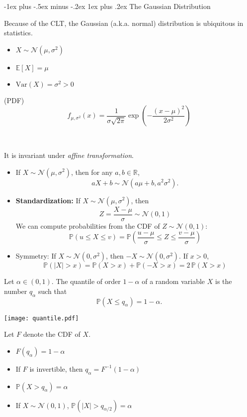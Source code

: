 \documentclass[a4paper, 10pt,landscape]{article}
\makeatletter
\newcommand{\var}{\textrm{Var}}
\renewcommand{\subsubsection}{\@startsection{subsubsection}{3}{0mm}%
                                {-1ex plus -.5ex minus -.2ex}%
                                {1ex plus .2ex}%
                                {\normalfont\small\bfseries}}
\makeatother
\begin{document}
\begin{multicols*}{3}
\subsubsection{The Gaussian Distribution}
\begin{description}
	\item Because of the CLT, the Gaussian (a.k.a. normal) distribution is ubiquitous in statistics.
	\begin{itemize}
		\item $X\sim\mathcal{N}\left(\mu,\sigma^2\right)$
		\item $\mathbb{E}\left[X\right]=\mu$
		\item $\var(X)=\sigma^2>0$
	\end{itemize}
	\item[Gaussian density] (PDF)
	$$f_{\mu,\sigma^2}(x)=\frac{1}{\sigma\sqrt{2\pi}}\exp\left(-\frac{(x-\mu)^2}{2\sigma^2}\right)$$
	\item[Useful Properties of Gaussian] ~

	It is invariant under {\it affine transformation}.
	\begin{itemize}
	\item  If $X\sim\mathcal{N}\left(\mu,\sigma^2\right)$, then for any $a,b\in\mathbb{R}$,
	$$aX+b\sim\mathcal{N}\left(a\mu+b,a^2\sigma^2\right).$$
	\item {\bf Standardization:} If $X\sim\mathcal{N}\left(\mu,\sigma^2\right)$, then
	$$Z=\dfrac{X-\mu}{\sigma}\sim\mathcal{N}\left(0,1\right)$$
	We can compute probabilities from the CDF of $Z\sim\mathcal{N}\left(0,1\right)$:
	$$\mathbb{P}\left(u\leq X\leq v\right)=\mathbb{P}\left(\dfrac{u-\mu}{\sigma}\leq Z\leq\dfrac{v-\mu}{\sigma}\right)$$
	\item {Symmetry:} If $X\sim\mathcal{N}\left(0,\sigma^2\right)$, then $-X\sim\mathcal{N}\left(0,\sigma^2\right)$. If $x>0$,
	$$\mathbb{P}\left(|X|>x\right)=\mathbb{P}\left(X>x\right)+\mathbb{P}\left(-X>x\right)=2\,\mathbb{P}\left(X>x\right)$$
	\end{itemize}
\item[Quantiles] Let $\alpha\in(0,1)$. The quantile of order $1-\alpha$ of a random variable $X$ is the number $q_\alpha$ such that $$\mathbb{P}\left(X\leq q_\alpha\right)=1-\alpha.$$
\begin{center}
	\texttt{[image: quantile.pdf]}
\end{center}
Let $F$ denote the CDF of $X$.
\begin{itemize}
	\item $F\left(q_\alpha\right)=1-\alpha$
	\item If $F$ is invertible, then $q_\alpha=F^{-1}\left(1-\alpha\right)$
	\item $\mathbb{P}\left(X>q_\alpha\right)=\alpha$
	\item If $X\sim\mathcal{N}\left(0,1\right)$, $\mathbb{P}\left(|X|>q_{\alpha/2}\right)=\alpha$
\end{itemize}
\end{description}



\end{multicols*}
\end{document}
